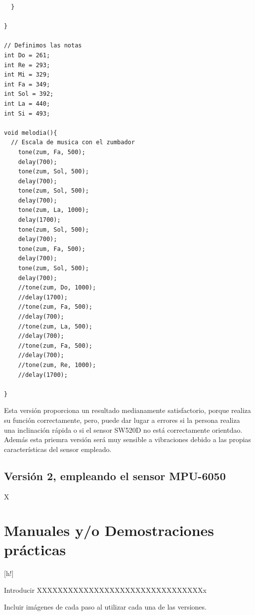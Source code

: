\begin{lstlisting}
  }

}

// Definimos las notas
int Do = 261;
int Re = 293;
int Mi = 329;
int Fa = 349;
int Sol = 392;
int La = 440;
int Si = 493;

void melodia(){
  // Escala de musica con el zumbador
    tone(zum, Fa, 500);
    delay(700);
    tone(zum, Sol, 500);
    delay(700);
    tone(zum, Sol, 500);
    delay(700);
    tone(zum, La, 1000);
    delay(1700);
    tone(zum, Sol, 500);
    delay(700);
    tone(zum, Fa, 500);
    delay(700);
    tone(zum, Sol, 500);
    delay(700);
    //tone(zum, Do, 1000);
    //delay(1700);
    //tone(zum, Fa, 500);
    //delay(700);
    //tone(zum, La, 500);
    //delay(700);
    //tone(zum, Fa, 500);
    //delay(700);
    //tone(zum, Re, 1000);
    //delay(1700);
    
}

\end{lstlisting}

Esta versión proporciona un resultado medianamente satisfactorio, porque realiza su función correctamente, pero, puede dar lugar a errores si la persona realiza una inclinación rápida o si el sensor SW520D no está correctamente orientdao. Además esta priemra versión será muy sensible a vibraciones debido a las propias características del sensor empleado.

\subsection{Versión 2, empleando el sensor MPU-6050}
X


\newpage
\section{Manuales y/o Demostraciones prácticas}[h!]

Introducir XXXXXXXXXXXXXXXXXXXXXXXXXXXXXXXXx

Incluir imágenes de cada paso al utilizar cada una de las versiones.




    
     